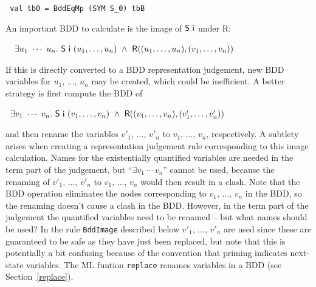 \documentclass[12pt]{article}
\newcommand{\con}[1]{\mbox{\sf #1}}
\newcommand{\ml}[1]{{\tt #1}}
\begin{document}
\vspace*{-1mm}

\begin{verbatim}
 val tb0 = BddEqMp (SYM S_0) tbB
\end{verbatim}

\vspace*{-1mm}

An important BDD to calculate is 
the image of $\con{S}~\con{i}$ under \con{R}:


\smallskip

~$\begin{array}{l}
\exists u_1~\cdots~u_n.~\con{S}~\con{i}~(u_1,\ldots,u_n)~\wedge~\con{R}((u_1,\ldots,u_n),(v_1,\ldots,v_n))
\end{array}
$

\smallskip

If this is directly converted to a BDD representation judgement, new BDD variables for
$u_1$, $\ldots$, $u_n$ may be created, which could be inefficient. A better strategy is
first compute the BDD of

\smallskip

~$\exists v_1~\cdots~v_n.
    ~\con{S}~\con{i}~(v_1,\ldots,v_n)~\wedge~\con{R}((v_1,\ldots,v_n),(v'_1,\ldots,v'_n))$

\smallskip

and then rename the variables $v'_1$, $\ldots$, $v'_n$ to $v_1$,
$\ldots$, $v_n$, respectively. A subtlety arises when creating a
representation judgement rule corresponding to this image
calculation. Names for the existentially quantified variables are
needed in the term part of the judgement, but ``$\exists v_1~\cdots~v_n$''
cannot be used, because the renaming of $v'_1$, $\ldots$, $v'_n$ to
$v_1$, $\ldots$, $v_n$ would then result in a clash. Note that the BDD
operation eliminates the nodes corresponding to $v_1$, $\ldots$, $v_n$
in the BDD, so the renaming doesn't cause a clash in the BDD. However,
in the term part of the judgement the quantified variables need to be
renamed -- but what names should be used? In the rule \ml{BddImage}
described below $v'_1$, $\ldots$, $v'_n$ are used since these are
guaranteed to be safe as they have just been replaced, but note that
this is potentially a bit confusing because of the convention that
priming indicates next-state variables. The ML funtion
\ml{replace} renames variables in a BDD (see Section~\ref{replace}).


\smallskip
\end{document}
